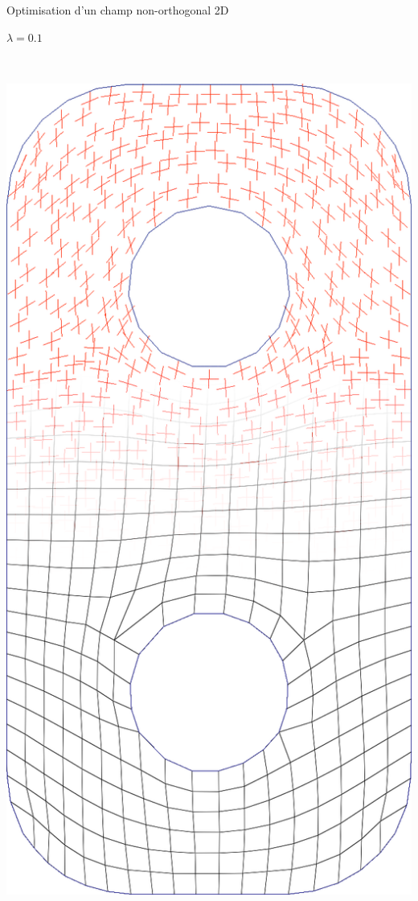 \begin{frame}{Optimisation d'un champ non-orthogonal 2D}
\begin{minipage}[b]{0.15\textwidth}
        $\lambda = 0.1$
    \end{minipage}
    \ \ \ 
    \begin{minipage}[b]{0.15\textwidth}
        \centering
        \includegraphics[width=\textwidth]{img_spm_ff/perced_9}

\end{minipage}
\end{frame}
